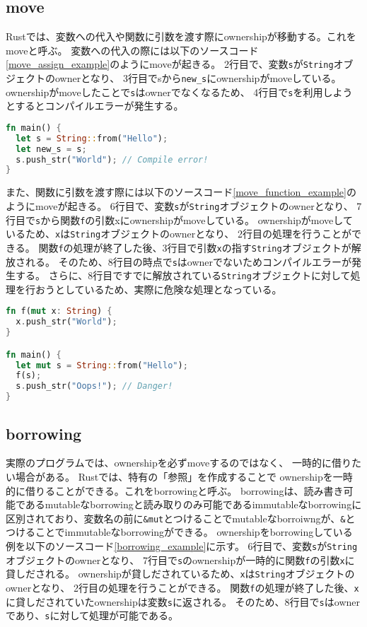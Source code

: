 \documentclass{sumiilab-paper}
\theoremstyle{mystyle}
\numberwithin{definition}{chapter} %
\begin{document}
\subsection{move}
Rustでは、変数への代入や関数に引数を渡す際にownershipが移動する。これをmoveと呼ぶ。
変数への代入の際には以下のソースコード\ref{move_assign_example}のようにmoveが起きる。
2行目で、変数\texttt{s}が\texttt{String}オブジェクトのownerとなり、
3行目でsから\texttt{new\_s}にownershipがmoveしている。
ownershipがmoveしたことで\texttt{s}はownerでなくなるため、
4行目で\texttt{s}を利用しようとするとコンパイルエラーが発生する。
\begin{lstlisting}[language=Rust, caption=変数への代入でmoveが起こる例, label=move_assign_example, captionpos=b]
fn main() {
  let s = String::from("Hello");
  let new_s = s;
  s.push_str("World"); // Compile error!
}    
\end{lstlisting}
また、関数に引数を渡す際には以下のソースコード\ref{move_function_example}のようにmoveが起きる。
6行目で、変数\texttt{s}が\texttt{String}オブジェクトのownerとなり、
7行目で\texttt{s}から関数\texttt{f}の引数xにownershipがmoveしている。
ownershipがmoveしているため、\texttt{x}は\texttt{String}オブジェクトのownerとなり、
2行目の処理を行うことができる。
関数\texttt{f}の処理が終了した後、3行目で引数\texttt{x}の指す\texttt{String}オブジェクトが解放される。
そのため、8行目の時点で\texttt{s}はownerでないためコンパイルエラーが発生する。
さらに、8行目ですでに解放されている\texttt{String}オブジェクトに対して処理を行おうとしているため、実際に危険な処理となっている。
\begin{lstlisting}[language=Rust, caption=関数に引数を渡す際にmoveが起こる例, label=move_function_example, captionpos=b]
fn f(mut x: String) {
  x.push_str("World");
}

fn main() {
  let mut s = String::from("Hello");
  f(s);
  s.push_str("Oops!"); // Danger!
}
\end{lstlisting}

\subsection{borrowing}
実際のプログラムでは、ownershipを必ずmoveするのではなく、
一時的に借りたい場合がある。
Rustでは、特有の「参照」を作成することで
ownershipを一時的に借りることができる。これをborrowingと呼ぶ。
borrowingは、読み書き可能であるmutableなborrowingと読み取りのみ可能であるimmutableなborrowingに区別されており、変数名の前に\texttt{\&mut}とつけることでmutableなborroiwngが、\texttt{\&}とつけることでimmutableなborrowingができる。
ownershipをborrowingしている例を以下のソースコード\ref{borrowing_example}に示す。
6行目で、変数\texttt{s}が\texttt{String}オブジェクトのownerとなり、
7行目で\texttt{s}のownershipが一時的に関数\texttt{f}の引数\texttt{x}に貸しだされる。
ownershipが貸しだされているため、\texttt{x}は\texttt{String}オブジェクトのownerとなり、
2行目の処理を行うことができる。
関数\texttt{f}の処理が終了した後、\texttt{x}に貸しだされていたownershipは変数\texttt{s}に返される。
そのため、8行目で\texttt{s}はownerであり、\texttt{s}に対して処理が可能である。
\end{document}
